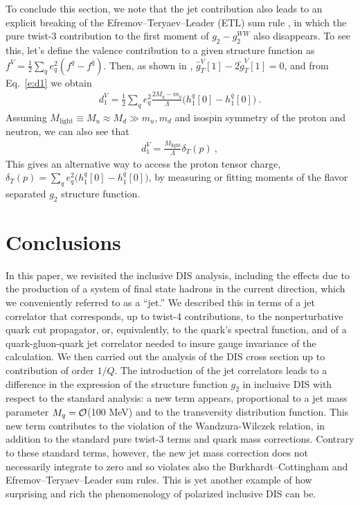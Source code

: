 \documentclass[preprintnumbers,floatfix,nofootinbib]{revtex4}
\def\AAcom#1{{\bf  \textcolor{Red}{[AA: {#1}]}}}
\newcommand{\mj}{M_q}
\newcommand{\mq}{m_q}
\begin{document}
To conclude this section, we note that the jet contribution also leads to an explicit breaking of the Efremov--Teryaev--Leader (ETL) sum rule \cite{Efremov:1996hd}, in which the pure twist-3 contribution to the first moment of $g_2-g_2^{WW}$ also disappears. To see this, let's define the valence contribution to a given structure function as $f^V=\frac12\sum_q e_q^2 (f^q-f^{\bar q})$. Then, as shown in \cite{Efremov:1996hd}, $\widehat g_T^V[1] - 2\tilde g_T^V[1] = 0$, and from Eq.~\eqref{e:d1} we obtain
\begin{align}
  d_1^V = \frac12 \sum_q e_q^2 \frac{2\mj- \mq}{\Lambda} 
    \big(h_1^{q}[0]-h_1^{\bar q}[0]\big) \ .
\end{align}
Assuming $M_\text{light}\equiv M_u \approx M_d \gg m_u , m_d$ and isospin symmetry of the proton and neutron, we can also see that 
\begin{align}
  d_1^V = \frac{M_{\text{light}}}{\Lambda} \delta_T(p) \ ,   
\end{align}
This gives an alternative way to access the proton tensor charge, $\delta_T(p) = \sum_q e_q^2 \big(h_1^{q}[0]-h_1^{\bar q}[0]\big)$, by measuring or fitting moments of the flavor separated $g_2$ structure function.





\section{Conclusions}

In this paper, we revisited the inclusive DIS analysis, including the
effects due to the production of a system of final state hadrons in the current direction, which we
conveniently referred to as a ``jet.'' We described this in terms of a jet
correlator that corresponds, up to twist-4 contributions, to the nonperturbative quark cut propagator, or, equivalently, to the quark's spectral function, and of a quark-gluon-quark jet correlator needed to insure gauge invariance of the calculation.
We then carried out the analysis of 
the DIS cross section up to contribution of order $1/Q$. 
The introduction of the jet correlators 
leads to a difference in the expression of the structure function $g_2$ in
inclusive DIS with respect to the standard analysis: a new term appears, proportional to a jet mass parameter $\mj={\cal O}$(100 MeV)
and to the transversity distribution function. This new term
contributes to the violation of the Wandzura-Wilczek relation, in addition to
the standard pure twist-3 terms and quark mass corrections. Contrary to these
standard terms, however, the new jet mass correction does not necessarily integrate to zero and so violates also the
Burkhardt--Cottingham and Efremov--Teryaev--Leader sum rules. This is yet another example of how surprising
and rich the phenomenology of polarized inclusive DIS can be. 
\end{document}
